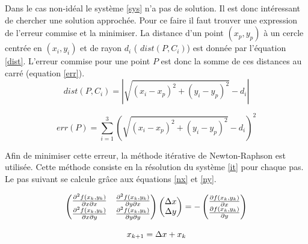 \documentclass[10pt,a4paper]{article}
\begin{document}
Dans le cas non-idéal le système \ref{sys} n'a pas de solution. Il est donc intéressant de chercher une solution approchée. Pour ce faire il faut trouver une expression de l'erreur commise et la minimiser. La distance d'un point $(x_p , y_p)$ à un cercle centrée en $(x_i , y_i)$ et de rayon $d_i$ ( $dist(P , C_i)$) est donnée par l'équation \ref{dist}. L'erreur commise pour une point $P$ est donc la somme de ces distances au carré (equation \ref{err}).
\begin{equation}
dist(P , C_i)= |{\sqrt{(x_i-x_p)^2 +(y_i - y_p)^2} - d_i}|
\label{dist}
\end{equation}

\begin{equation}
\label{err}
err(P) = \sum _{i=1} ^{3} (\sqrt{(x_i-x_p)^2 +(y_i - y_p)^2} - d_i)^2
\end{equation}

Afin de minimiser cette erreur, la méthode itérative de Newton-Raphson est utilisée. Cette méthode consiste en la résolution du système \ref{it} pour chaque pas. Le pas suivant se calcule grâce aux équations \ref{nx} et \ref{ny}. 

\begin{equation}
	\centering
	\begin{pmatrix}
		\frac{\partial^2 f(x_k , y_k)}{\partial x \partial x} & \frac{\partial^2 f(x_k , y_k)}{\partial y \partial x} \\
		\frac{\partial^2 f(x_k , y_k)}{\partial x \partial y} & \frac{\partial^2 f(x_k , y_k)}{\partial y \partial y} 
 	\end{pmatrix} 
 	 \begin{pmatrix}
 	 	\Delta x \\
 	 	\Delta y 
 	 \end{pmatrix}
 	 = - 
 	 \begin{pmatrix}
 	 	\frac{\partial f(x_k , y_k)}{\partial x}\\
 	 	\frac{\partial f(x_k , y_k)}{\partial y} 
 	 \end{pmatrix}
 	 \label{it}
\end{equation}

\begin{equation}
	\centering
	\label{nx}
	x_{k+1} = \Delta x + x_k
\end{equation}
\end{document}
